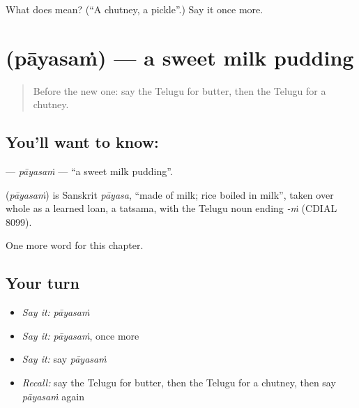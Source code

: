 \begin{tcolorbox}[breakable,colback=teal!4,colframe=teal!35!black,title={Before you move on}]
What does  mean? (\textquotedblleft{}A chutney, a pickle\textquotedblright{}.) Say it once more.
\end{tcolorbox}
\section[\texorpdfstring{\te{పాయసం} (pāyasaṁ)}{పాయసం (pāyasaṁ)}]{ (pāyasaṁ) — a sweet milk pudding}

\label{lesson:TE-C184-payasam}



\begin{quote}
Before the new one: say the Telugu for butter, then the Telugu for a chutney.
\end{quote}

\subsection*{You'll want to know: }
\textbf{} — \emph{pāyasaṁ} — \textquotedblleft{}a sweet milk pudding\textquotedblright{}.

\begin{cousinweb}
\textbf{} (\emph{pāyasaṁ}) is Sanskrit \emph{pāyasa}, \textquotedblleft{}made of milk; rice boiled in milk\textquotedblright{}, taken over whole as a learned loan, a tatsama, with the Telugu noun ending \emph{-ṁ} (CDIAL 8099).
\end{cousinweb}

\begin{grammarlens}[title={What you've built}]
One more word for this chapter.
\end{grammarlens}

\subsection*{Your turn}
\begin{itemize}
\raggedright
  \item \emph{Say it:} \emph{pāyasaṁ}
  \item \emph{Say it:} \emph{pāyasaṁ}, once more
  \item \emph{Say it:} say \emph{pāyasaṁ}
  \item \emph{Recall:} say the Telugu for butter, then the Telugu for a chutney, then say \emph{pāyasaṁ} again
\end{itemize}

